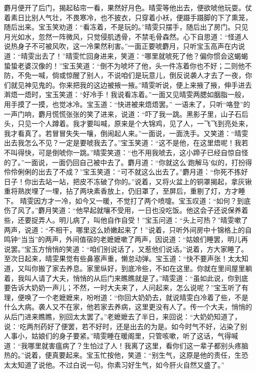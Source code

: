 \documentclass[12pt,oneside]{book}
\begin{document}
麝月便开了后门，揭起毡帘一看，果然好月色。晴雯等他出去，便欲唬他玩耍。仗着素日比别人气壮，不畏寒冷，也不披衣，只穿着小袄，便蹑手蹑脚的下了熏笼，随后出来。宝玉笑劝道：“看冻着，不是玩的。”晴雯只摆手，随后出了房门。只见月光如水，忽然一阵微风，只觉侵肌透骨，不禁毛骨森然。心下自思道：“怪道人说热身子不可被风吹，这一冷果然利害。”一面正要唬麝月，只听宝玉高声在内说道：“晴雯出去了！”晴雯忙回身进来，笑道：“哪里就唬死了他？偏你惯会这蝎蝎蛰蛰老婆汉像的！”宝玉笑道：“倒不为唬坏了他，头一件冻着你也不好；二则他不防，不免一喊，倘或惊醒了别人，不说咱们是玩意儿，倒反说袭人才去了一夜，你们就见神见鬼的。你来把我的这边被掖一掖。”晴雯听说，便上来掖了掖，伸手进去濣焐一焐时，宝玉笑道：“好冷手！我说看冻着。”一面又见晴雯两腮如胭脂一般，用手摸了一摸，也觉冰冷。宝玉道：“快进被来焐焐罢。”
一语未了，只听“咯登”的一声门响，麝月慌慌张张的笑了进来，说道：“吓了我一跳。黑影子里，山子石后头，只见一个人蹲着。我才要叫喊，原来是个大锦鸡，见了人，一飞飞到亮处来，我才看真了。若冒冒失失一嚷，倒闹起人来。”一面说，一面洗手。又笑道：“晴雯出去我怎么不见？一定是要唬我去了。”宝玉笑道：“这不是他，在这里焐呢！我若不叫得快，可是倒唬你一跳。”晴雯笑道：“也不用我唬去，这小蹄子已经自惊自怪的了。”一面说，一面仍回自己被中去了。麝月道：“你就这么‘跑解马’似的，打扮得伶伶俐俐的出去了不成？”宝玉笑道：“可不就这么出去了。”麝月道：“你死不拣好日子！你出去站一站，把皮不冻破了你的。”说着，又将火盆上的铜罩揭起，拿灰锹重将熟炭埋了一埋，拈了两块素香放上，仍旧罩了，至屏后，重剔了灯，方才睡下。
晴雯因方才一冷，如今又一暖，不觉打了两个喷嚏。宝玉叹道：“如何？到底伤了风了。”麝月笑道：“他早起就嚷不受用，一日也没吃饭。他这会子还说保养着些，还要捉弄人。明儿病了，叫他自作自受！”宝玉问道：“头上可热？”晴雯嗽了两声，说道：“不相干，哪里这么娇嫩起来了！”说着，只听外间房中十锦格上的自鸣钟“当当”的两声，外间值宿的老嬷嬷嗽了两声，因说道：“姑娘们睡罢，明儿再说罢。”宝玉方悄悄的笑道：“咱们别说话了，又惹他们说话。”说着，方大家睡了。
至次日起来，晴雯果觉有些鼻塞声重，懒怠动弹。宝玉道：“快不要声张！太太知道，又叫你搬了家去养息。家里纵好，到底冷些，不如在这里。你就在里间屋里躺着，我叫人请了大夫，悄悄的从后门来瞧瞧就是了。”晴雯道：“虽如此说，你到底要告诉大奶奶一声儿；不然，一时大夫来了，人问起来，怎么说呢？”宝玉听了有理，便唤了一个老嬷嬷来，吩咐道：“你回大奶奶去，就说晴雯白冷着了些，不是什么大病。袭人又不在家，他若家去养病，这里更没有人了。传一个大夫，悄悄的从后门进来瞧瞧，别回太太罢了。”老嬷嬷去了半日，来回说：“大奶奶知道了，说：‘吃两剂药好了便罢，若不好时，还是出去的为是。如今时气不好，沾染了别人事小，姑娘们的身子要紧。”晴雯睡在暖阁里，只管咳嗽，听了这话，气得喊道：“我哪里就害瘟病了？生怕过了人！我离了这里，看你们这一辈子都别头疼脑热的。”说着，便真要起来。宝玉忙按他，笑道：“别生气，这原是他的责任，生恐太太知道了说他。不过白说一句。你素习好生气，如今肝火自然又盛了。”
\end{document}
